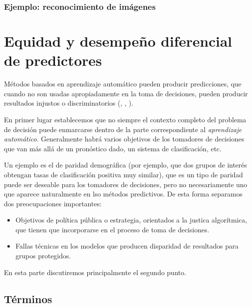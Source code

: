 \documentclass[
]{book}
\providecommand{\tightlist}{%
  \setlength{\itemsep}{0pt}\setlength{\parskip}{0pt}}
\begin{document}
\hypertarget{ejemplo-reconocimiento-de-imuxe1genes}{%
\subsubsection*{Ejemplo: reconocimiento de imágenes}\label{ejemplo-reconocimiento-de-imuxe1genes}}


\hypertarget{equidad-y-desempeuxf1o-diferencial-de-predictores}{%
\section{Equidad y desempeño diferencial de predictores}\label{equidad-y-desempeuxf1o-diferencial-de-predictores}}

Métodos basados en aprendizaje automático pueden producir predicciones, que cuando no son usadas apropiadamente
en la toma de decisiones, pueden producir resultados injustos o discriminatorios (\citep{boulamwini}, \citep{barocas}, \citep{bolukbasi}).

En primer lugar establecemos que no siempre el contexto completo del problema de decisión puede enmarcarse dentro
de la parte correspondiente al \emph{aprendizaje automático}. Generalmente habrá varios objetivos de los tomadores de decisiones
que van más allá de un pronóstico dado, un sistema de clasificación, etc.

Un ejemplo es el de paridad demográfica (por ejemplo, que dos grupos de interés obtengan tasas de clasificación positiva
muy similar), que es un tipo de paridad puede ser deseable para los tomadores de decisiones, pero no necesariamente uno
que aparece naturalmente en lso métodos predictivos. De esta forma separamos dos preocupaciones importantes:

\begin{itemize}
\tightlist
\item
  Objetivos de política pública o estrategia, orientados a la justica algorítmica,
  que tienen que incorporarse en el proceso de toma de decisiones.
\item
  Fallas técnicas en los modelos que producen disparidad de resultados para grupos protegidos.
\end{itemize}

En esta parte discutiremos principalmente el segundo punto.

\hypertarget{tuxe9rminos-3}{%
\subsection{Términos}\label{tuxe9rminos-3}}
\end{document}
